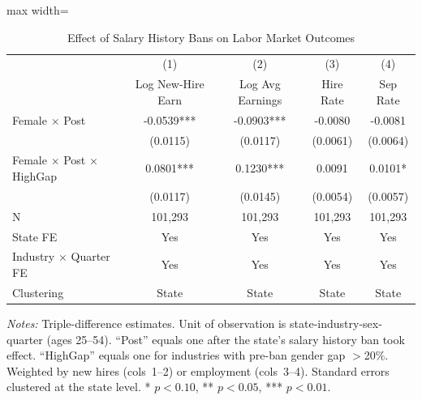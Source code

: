 \begin{table}[H]
\centering
\caption{Effect of Salary History Bans on Labor Market Outcomes}
\label{tab:main}
\begin{adjustbox}{max width=\textwidth}
\begin{tabular}{lcccc}
\toprule
 & (1) & (2) & (3) & (4) \\
 & Log New-Hire Earn & Log Avg Earnings & Hire Rate & Sep Rate \\
\midrule
Female $\times$ Post & -0.0539*** & -0.0903*** & -0.0080 & -0.0081 \\
 & (0.0115) & (0.0117) & (0.0061) & (0.0064) \\
\addlinespace
Female $\times$ Post $\times$ HighGap & 0.0801*** & 0.1230*** & 0.0091 & 0.0101* \\
 & (0.0117) & (0.0145) & (0.0054) & (0.0057) \\
\addlinespace
\midrule
N & 101,293 & 101,293 & 101,293 & 101,293 \\
State FE & Yes & Yes & Yes & Yes \\
Industry $\times$ Quarter FE & Yes & Yes & Yes & Yes \\
Clustering & State & State & State & State \\
\bottomrule
\end{tabular}
\end{adjustbox}

\vspace{0.5em}
{\small \emph{Notes:} Triple-difference estimates. Unit of observation is state-industry-sex-quarter (ages 25--54). ``Post'' equals one after the state's salary history ban took effect. ``HighGap'' equals one for industries with pre-ban gender gap ${>}$20\%. Weighted by new hires (cols~1--2) or employment (cols~3--4). Standard errors clustered at the state level. * $p{<}0.10$, ** $p{<}0.05$, *** $p{<}0.01$.}
\end{table}

